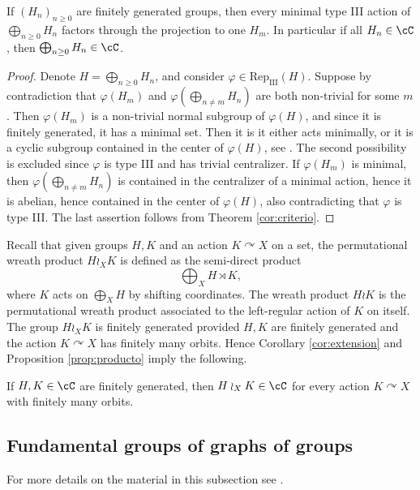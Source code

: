 \documentclass[reqno]{amsart}
\begin{document}
\begin{prop} \label{prop:producto}
If $(H_n)_{n \geq 0}$ are finitely generated groups, then every minimal type III action of $\bigoplus_{n \geq 0} H_n $ factors through the projection to one $H_m$. In particular if all  $H_n\in \cC$, then $\bigoplus_{n \geq 0} H_n \in \cC$.
\end{prop}
\begin{proof}



 Denote $H = \bigoplus_{n \geq 0} H_n$, and consider $\varphi \in \mathrm{Rep}_\mathrm{III}(H)$. Suppose by contradiction that $\varphi(H_m)$ and $\varphi(\bigoplus_{n\neq m} H_n)$ are both non-trivial for some $m$. Then $\varphi(H_m)$  is a non-trivial normal subgroup of $\varphi(H)$, and since it is finitely generated, it has a minimal set. Then it is  it either acts minimally, or it is a cyclic subgroup contained in the center of $\varphi(H)$, see \cite[Lemma 8.3.6]{BMRT}. The second possibility is excluded since $\varphi$ is type III and has trivial centralizer. If $\varphi(H_m)$  is minimal, then $\varphi(\bigoplus_{n\neq m} H_n)$ is contained in the centralizer of a minimal action, hence it is abelian, hence contained in the center of $\varphi(H)$, also contradicting that $\varphi$ is type III. The last assertion follows from Theorem \ref{cor:criterio}.\qedhere






\end{proof}

Recall that given groups $H, K$ and an action $K\curvearrowright X$ on a set, the permutational wreath product $H\wr_X K$ is defined as the semi-direct product 
\[\bigoplus_X H\rtimes K,\]
where $K$ acts on $\bigoplus_X H$ by shifting coordinates.  The wreath product $H\wr K$ is the permutational wreath product associated to the left-regular action of $K$ on itself.  The group $H\wr_X K$ is finitely generated provided $H, K$ are finitely generated and the action $K\curvearrowright X$ has finitely many orbits. Hence Corollary \ref{cor:extension} and Proposition \ref{prop:producto} imply the following.
\begin{cor} \label{cor:wreath}
    If $H, K\in \cC$ are finitely generated, then $H\wr_X K\in \cC$ for every action $K\curvearrowright X$ with finitely many orbits.
\end{cor}

\subsection{Fundamental groups of graphs of groups} \label{subsection:BassSerre}
For more details on the material in this subsection see \cite{Serre1977}.
\end{document}
